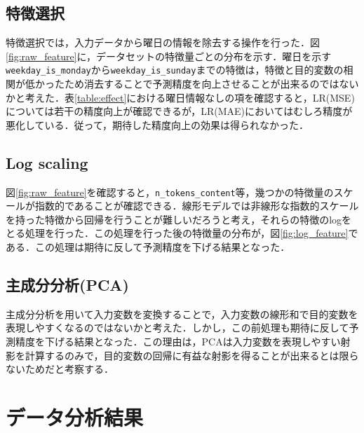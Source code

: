 \subsection{特徴選択}
特徴選択では，入力データから曜日の情報を除去する操作を行った．図\ref{fig:raw_feature}に，データセットの特徴量ごとの分布を示す．曜日を示す\texttt{weekday\_is\_monday}から\texttt{weekday\_is\_sunday}までの特徴は，特徴と目的変数の相関が低かったため消去することで予測精度を向上させることが出来るのではないかと考えた．表\ref{table:effect}における曜日情報なしの項を確認すると，LR(MSE)については若干の精度向上が確認できるが，LR(MAE)においてはむしろ精度が悪化している．従って，期待した精度向上の効果は得られなかった．
\subsection{Log scaling}
図\ref{fig:raw_feature}を確認すると，\texttt{n\_tokens\_content}等，幾つかの特徴量のスケールが指数的であることが確認できる．線形モデルでは非線形な指数的スケールを持った特徴から回帰を行うことが難しいだろうと考え，それらの特徴のlogをとる処理を行った．この処理を行った後の特徴量の分布が，図\ref{fig:log_feature}である．この処理は期待に反して予測精度を下げる結果となった．
\subsection{主成分分析(PCA)}
主成分分析を用いて入力変数を変換することで，入力変数の線形和で目的変数を表現しやすくなるのではないかと考えた．しかし，この前処理も期待に反して予測精度を下げる結果となった．この理由は，PCAは入力変数を表現しやすい射影を計算するのみで，目的変数の回帰に有益な射影を得ることが出来るとは限らないためだと考察する．



\section{データ分析結果}
